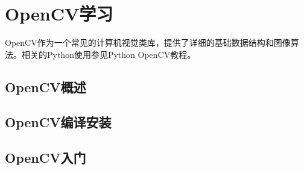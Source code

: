 \documentclass[../main.tex]{subfiles}
\begin{document}
\chapter{OpenCV学习}
OpenCV作为一个常见的计算机视觉类库，提供了详细的基础数据结构和图像算法。相关的Python使用参见Python OpenCV教程。
\section{OpenCV概述}
\section{OpenCV编译安装}
\section{OpenCV入门}
\end{document}
